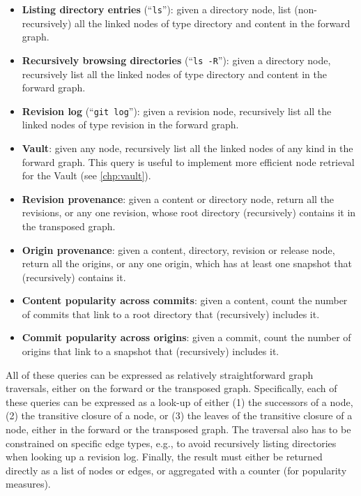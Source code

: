 \begin{itemize}
    \item \textbf{Listing directory entries} (``\texttt{ls}''): given a
        directory node, list (non-recursively) all the linked nodes of type
        directory and content in the forward graph.
    \item \textbf{Recursively browsing directories} (``\texttt{ls -R}''): given
        a directory node, recursively list all the linked nodes of type
        directory and content in the forward graph.
    \item \textbf{Revision log} (``\texttt{git log}''): given
        a revision node, recursively list all the linked nodes of type
        revision in the forward graph.
    \item \textbf{Vault}: given any node, recursively list all the linked nodes
        of any kind in the forward graph. This query is useful to implement
        more efficient node retrieval for the Vault (see \cref{chp:vault}).
    \item \textbf{Revision provenance}: given a content or directory node,
        return all the revisions, or any one revision, whose root directory
        (recursively) contains it in the transposed graph.
    \item \textbf{Origin provenance}: given a content, directory, revision or
        release node, return all the origins, or any one origin, which has at
        least one snapshot that (recursively) contains it.
    \item \textbf{Content popularity across commits}: given a content, count
        the number of commits that link to a root directory that (recursively)
        includes it.
    \item \textbf{Commit popularity across origins}: given a commit, count
        the number of origins that link to a snapshot that (recursively)
        includes it.
\end{itemize}

All of these queries can be expressed as relatively straightforward graph
traversals, either on the forward or the transposed graph. Specifically, each
of these queries can be expressed as a look-up of either (1) the successors of
a node, (2) the transitive closure of a node, or (3) the leaves of the
transitive closure of a node, either in the forward or the transposed graph.
The traversal also has to be constrained on specific edge types, e.g., to avoid
recursively listing directories when looking up a revision log. Finally, the
result must either be returned directly as a list of nodes or edges, or
aggregated with a counter (for popularity measures).

